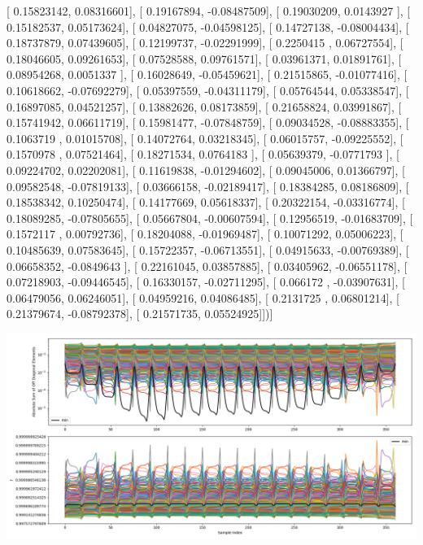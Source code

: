 \documentclass{article}
\begin{document}
       [ 0.15823142,  0.08316601],
       [ 0.19167894, -0.08487509],
       [ 0.19030209,  0.0143927 ],
       [ 0.15182537,  0.05173624],
       [ 0.04827075, -0.04598125],
       [ 0.14727138, -0.08004434],
       [ 0.18737879,  0.07439605],
       [ 0.12199737, -0.02291999],
       [ 0.2250415 ,  0.06727554],
       [ 0.18046605,  0.09261653],
       [ 0.07528588,  0.09761571],
       [ 0.03961371,  0.01891761],
       [ 0.08954268,  0.0051337 ],
       [ 0.16028649, -0.05459621],
       [ 0.21515865, -0.01077416],
       [ 0.10618662, -0.07692279],
       [ 0.05397559, -0.04311179],
       [ 0.05764544,  0.05338547],
       [ 0.16897085,  0.04521257],
       [ 0.13882626,  0.08173859],
       [ 0.21658824,  0.03991867],
       [ 0.15741942,  0.06611719],
       [ 0.15981477, -0.07848759],
       [ 0.09034528, -0.08883355],
       [ 0.1063719 ,  0.01015708],
       [ 0.14072764,  0.03218345],
       [ 0.06015757, -0.09225552],
       [ 0.1570978 ,  0.07521464],
       [ 0.18271534,  0.0764183 ],
       [ 0.05639379, -0.0771793 ],
       [ 0.09224702,  0.02202081],
       [ 0.11619838, -0.01294602],
       [ 0.09045006,  0.01366797],
       [ 0.09582548, -0.07819133],
       [ 0.03666158, -0.02189417],
       [ 0.18384285,  0.08186809],
       [ 0.18538342,  0.10250474],
       [ 0.14177669,  0.05618337],
       [ 0.20322154, -0.03316774],
       [ 0.18089285, -0.07805655],
       [ 0.05667804, -0.00607594],
       [ 0.12956519, -0.01683709],
       [ 0.1572117 ,  0.00792736],
       [ 0.18204088, -0.01969487],
       [ 0.10071292,  0.05006223],
       [ 0.10485639,  0.07583645],
       [ 0.15722357, -0.06713551],
       [ 0.04915633, -0.00769389],
       [ 0.06658352, -0.0849643 ],
       [ 0.22161045,  0.03857885],
       [ 0.03405962, -0.06551178],
       [ 0.07218903, -0.09446545],
       [ 0.16330157, -0.02711295],
       [ 0.066172  , -0.03907631],
       [ 0.06479056,  0.06246051],
       [ 0.04959216,  0.04086485],
       [ 0.2131725 ,  0.06801214],
       [ 0.21379674, -0.08792378],
       [ 0.21571735,  0.05524925]])]
\begin{center}
\includegraphics[scale=.9]{report_pickled_controls115/control_dpn_all.png}

\end{center}
\end{document}

